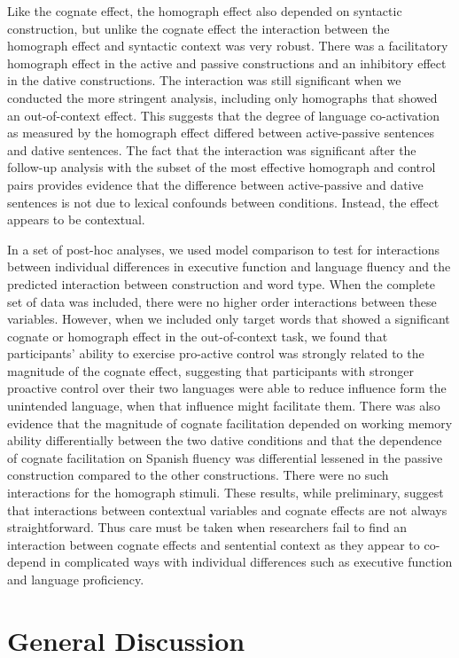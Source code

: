 Like the cognate effect, the homograph effect also depended on syntactic construction, but unlike the cognate effect the interaction between the homograph effect and syntactic context was very robust. There was a facilitatory homograph effect in the active and passive constructions and an inhibitory effect in the dative constructions. The interaction was still significant when we conducted the more stringent analysis, including only homographs that showed an out-of-context effect. This suggests that the degree of language co-activation as measured by the homograph effect differed between active-passive sentences and dative sentences. The fact that the interaction was significant after the follow-up analysis with the subset of the most effective homograph and control pairs provides evidence that the difference between active-passive and dative sentences is not due to lexical confounds between conditions. Instead, the effect appears to be contextual. 

In a set of post-hoc analyses, we used model comparison to test for interactions between individual differences in executive function and language fluency and the predicted interaction between construction and word type. When the complete set of data was included, there were no higher order interactions between these variables. However, when we included only target words that showed a significant cognate or homograph effect in the out-of-context task, we found that participants' ability to exercise pro-active control was strongly related to the magnitude of the cognate effect, suggesting that participants with stronger proactive control over their two languages were able to reduce influence form the unintended language, when that influence might facilitate them. There was also evidence that the magnitude of cognate facilitation depended on working memory ability differentially between the two dative conditions and that the dependence of cognate facilitation on Spanish fluency was differential lessened in the passive construction compared to the other constructions. There were no such interactions for the homograph stimuli. These results, while preliminary, suggest that interactions between contextual variables and cognate effects are not always straightforward. Thus care must be taken when researchers fail to find an interaction between cognate effects and sentential context as they appear to co-depend in complicated ways with individual differences such as executive function and language proficiency. 

\section{General Discussion}
\label{generaldiscussion}

